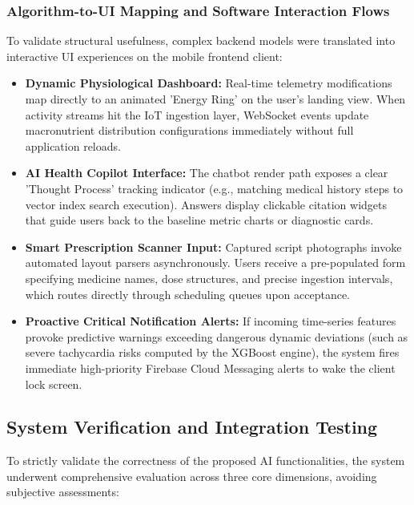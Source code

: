\documentclass[journal, a4paper]{IEEEtran}
\begin{document}
\subsubsection{Algorithm-to-UI Mapping and Software Interaction Flows}
To validate structural usefulness, complex backend models were translated into interactive UI experiences on the mobile frontend client:
\begin{itemize}
    \item \textbf{Dynamic Physiological Dashboard:} Real-time telemetry modifications map directly to an animated 'Energy Ring' on the user's landing view. When activity streams hit the IoT ingestion layer, WebSocket events update macronutrient distribution configurations immediately without full application reloads.
    \item \textbf{AI Health Copilot Interface:} The chatbot render path exposes a clear 'Thought Process' tracking indicator (e.g., matching medical history steps to vector index search execution). Answers display clickable citation widgets that guide users back to the baseline metric charts or diagnostic cards.
    \item \textbf{Smart Prescription Scanner Input:} Captured script photographs invoke automated layout parsers asynchronously. Users receive a pre-populated form specifying medicine names, dose structures, and precise ingestion intervals, which routes directly through scheduling queues upon acceptance.
    \item \textbf{Proactive Critical Notification Alerts:} If incoming time-series features provoke predictive warnings exceeding dangerous dynamic deviations (such as severe tachycardia risks computed by the XGBoost engine), the system fires immediate high-priority Firebase Cloud Messaging alerts to wake the client lock screen.
\end{itemize}

\subsection{System Verification and Integration Testing}
To strictly validate the correctness of the proposed AI functionalities, the system underwent comprehensive evaluation across three core dimensions, avoiding subjective assessments:
\end{document}
